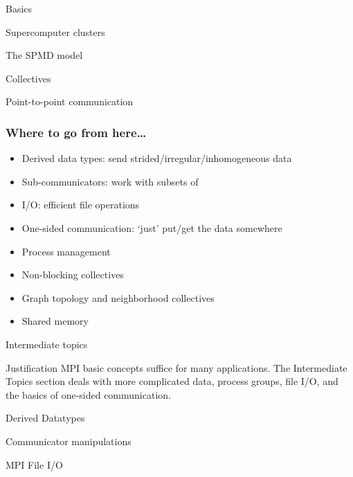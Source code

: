 \documentclass[10pt]{beamer}
\begin{document}
 {Basics}

\renewcommand\standardversion{3}

 {Supercomputer clusters}


{} {The SPMD model}
\label{sec:spmd}


{} {Collectives}
\label{sec:collectives}


{} {Point-to-point communication}
\label{sec:ptp}


\begin{frame}[containsverbatim]\frametitle{Where to go from here\ldots}
  \begin{itemize}
  \item Derived data types: send strided/irregular/inhomogeneous data
  \item Sub-communicators: work with subsets of 
  \item I/O: efficient file operations
  \item One-sided communication: `just' put/get the data somewhere
  \item Process management
  \item Non-blocking collectives
  \item Graph topology and neighborhood collectives
  \item Shared memory
  \end{itemize}
\end{frame}

\renewcommand\standardversion{}

{} {Intermediate topics}

\begin{frame}{Justification}
  MPI basic concepts suffice for many applications.  The Intermediate
  Topics section deals with more complicated data, process groups,
  file I/O, and the basics of one-sided communication.
\end{frame}

{} {Derived Datatypes}
\label{sec:derived}


{} {Communicator manipulations}
\label{sec:comm}


{} {MPI File I/O}
\label{sec:io}

\end{document}

